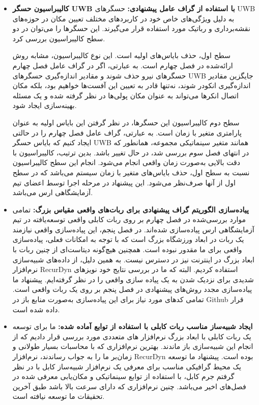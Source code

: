 \begin{itemize}
\item \textbf{کالیبراسیون حسگر UWB با استفاده از گراف عامل پیشنهادی:} 
حسگرهای UWB به دلیل ویژگی‌های خاص خود در کاربردهای مختلف تعیین مکان در حوزه‌های نقشه‌برداری و رباتیک مورد استفاده قرار می‌گیرند. این حسگرها را می‌توان در دو سطح کالیبراسیون بررسی کرد.

سطح اول، حذف بایاس‌های اولیه است. این نوع کالیبراسیون، مشابه روش ارائه‌شده در فصل چهارم است. به عبارتی، اگر در گراف عامل فصل چهارم حسگرهای نیرو حذف شوند و مقادیر اندازه‌گیری حسگرهای UWB جایگزین مقادیر اندازه‌گیری انکودر شوند، نه‌تنها قادر به تعیین این آفست‌ها خواهیم بود، بلکه مکان اتصال انکرها می‌تواند به عنوان مکان پولی‌ها در نظر گرفته شده و یک مسئله بهینه‌سازی ایجاد شود.

سطح دوم کالیبراسیون این حسگرها، در نظر گرفتن این بایاس اولیه به عنوان پارامتری متغیر با زمان است. به عبارتی، گراف عامل فصل چهارم را در حالتی ایجاد کنیم که بایاس حسگر UWB همانند متغیر سینماتیکی مجموعه، همانطور که در انتهای فصل سوم بررسی شد، در حال تغییر باشد. بدین ترتیب، کالیبراسیون با دقت بالایی به‌صورت زمان واقعی انجام می‌شود. انجام این سطح کالیبراسیون نسبت به سطح اول، حذف بایاس‌های متغیر با زمان سیستم می‌باشد که در سطح اول از آنها صرف‌نظر می‌شود. این پیشنهاد در مرحله اجرا توسط اعضای تیم آزمایشگاهی ارس می‌باشد.


\item \textbf{پیاده‌سازی الگوریتم گراف پیشنهادی برای ربات‌های واقعی مقیاس بزرگ:} 
تمامی موارد بررسی‌شده در فصل چهارم بر روی ربات کابلی واقعی توسعه‌یافته در تیم آزمایشگاهی ارس پیاده‌سازی شده‌اند. در فصل پنجم، این پیاده‌سازی واقعی نیازمند یک ربات در ابعاد ورزشگاه بزرگ است که با توجه به امکانات فعلی، پیاده‌سازی واقعی برای ما مقدور نبوده است. همچنین هیچ‌گونه دیتاست‌ای از چنین ربات با ابعاد بزرگ در اینترنت نیز در دسترس نیست. به همین دلیل، از داده‌های شبیه‌سازی نرم‌افزار RecurDyn استفاده کردیم. البته که ما در بررسی نتایج خود نویزهای شدیدی برای نزدیک شدن به یک پیاده سازی واقعی را در نظر گرفته‌ایم. پیشنهاد ما پیاده‌سازی مجدد روش‌های پیشنهادی در فصل پنجم بر روی یک ربات واقعی است. تمامی کدهای مورد نیاز برای این پیاده‌سازی به‌صورت منابع باز در Github قرار داده شده است.

\item \textbf{ایجاد شبیه‌ساز مناسب ربات کابلی با استفاده از توابع آماده شده:} 
ما برای توسعه یک ربات کابلی با ابعاد بزرگ نرم‌افزار های متعددی مورد بررسی قرار دادیم که از انجام این شبیه‌سازی باز ماندند. بهترین نرم‌افزاری که با محاسبات بسیار طولانی و زمان‌بر ما را به جواب رساندند، نرم‌افزار RecurDyn بوده است. پیشنهاد ما توسعه یک محیط گرافیکی مناسب برای معرفی یک نرم‌افزار شبیه‌ساز کابل با در نظر گرفتم جرم کابل، با استفاده از توابع سینماتیکی و مکان‌یابی معرفی شده در فصل‌های اخیر می‌باشد. چنین نرم‌افزاری که دارای سرعت بالا باشد طبق آخرین تحقیقات ما توسعه نیافته است.


\end{itemize}

